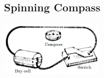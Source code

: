 \begin{multicols}{2}
%
%

\subsection{Spinning Compass}

\begin{center}
\includegraphics[width=0.38\textwidth]{./img/spinning-compass.jpg}
\end{center}


\end{multicols}

